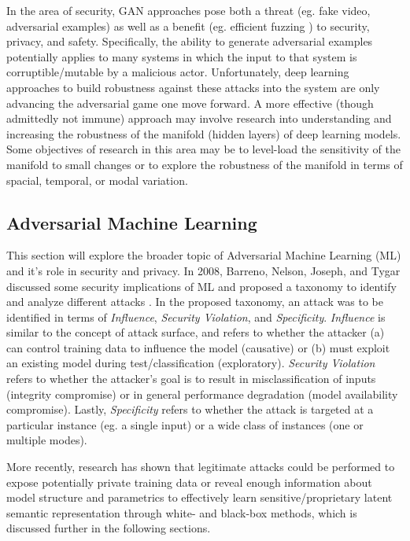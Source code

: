 \documentclass[11pt]{article}
\begin{document}
In the area of security, GAN approaches pose both a threat (eg. fake video, adversarial examples) as well as a benefit (eg. efficient fuzzing \cite{hu2018ganfuzz}) to security, privacy, and safety.  Specifically, the ability to generate adversarial examples potentially applies to many systems in which the input to that system is corruptible/mutable by a malicious actor.  Unfortunately, deep learning approaches to build robustness against these attacks into the system are only advancing the adversarial game one move forward.  A more effective (though admittedly not immune) approach may involve research into understanding and increasing the robustness of the manifold (hidden layers) of deep learning models.  Some objectives of research in this area may be to level-load the sensitivity of the manifold to small changes or to explore the robustness of the manifold in terms of spacial, temporal, or modal variation.

\subsection{Adversarial Machine Learning}

This section will explore the broader topic of Adversarial Machine Learning (ML) and it's role in security and privacy.  In 2008, Barreno, Nelson, Joseph, and Tygar discussed some security implications of ML and proposed a taxonomy to identify and analyze different attacks \cite{barreno2010security}.  In the proposed taxonomy, an attack was to be identified in terms of \textit{Influence}, \textit{Security Violation}, and \textit{Specificity}.  \textit{Influence} is similar to the concept of attack surface, and refers to whether the attacker (a) can control training data to influence the model (causative) or (b) must exploit an existing model during test/classification (exploratory).  \textit{Security Violation} refers to whether the attacker's goal is to result in misclassification of inputs (integrity compromise) or in general performance degradation (model availability compromise).  Lastly, \textit{Specificity} refers to whether the attack is targeted at a particular instance (eg. a single input) or a wide class of instances (one or multiple modes).

More recently, research has shown that legitimate attacks could be performed to expose potentially private training data or reveal enough information about model structure and parametrics to effectively learn sensitive/proprietary latent semantic representation through white- and black-box methods, which is discussed further in the following sections.
\end{document}
